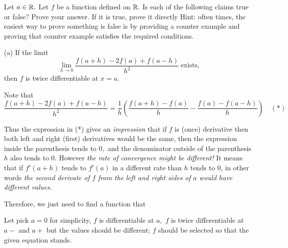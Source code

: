\documentclass{article}
\begin{document}
\newpage

\begin{problem*}[Problem 2a]
    Let $a \in \mathbb R.$ Let $f$ be a function defined on $\mathbb R.$
    Is each of the following claims true or false? Prove your answer.
    If it is true, prove it directly
    Hint: often times, the easiest way to prove something is false is by providing a counter example
    and proving that counter example satisfies the required conditions.

    (a) If the limit 
    \[
        \lim_{h \rightarrow 0} \frac{f(a+h) - 2f(a) + f(a-h)}{h^2}\ \text{exists,}
    \]
    then $f$ is twice differentiable at $x=a.$
\end{problem*}

\begin{remark*}
    Note that
    \[
        \frac{f(a+h) - 2f(a) + f(a-h)}{h^2} = \frac{1}{h} \left( \frac{f(a+h) - f(a)}{h} -  \frac{f(a) - f(a-h)}{h} \right) \quad (*)
    \]

    Thus the expression in (*) gives an \textit{impression} that if $f$ is (once) derivative then both left and right (first) derivatives would be the same,
    then the expression inside the parenthesis tends to $0,$ and the denominator outside of the parenthesis $h$ also tends to 0.
    However \textit{the rate of convergence might be different!}
    It means that if $f'(a+h)$ tends to $f'(a)$ in a different rate than $h$ tends to 0,
    in other words \textit{the second derivate of $f$ from the left and right sides of $a$ would have different values.}
    
    Therefore, we just need to find a function that
    \begin{itemize}[topsep=0pt, partopsep=0pt, itemsep=0pt]
        \ii Let pick $a=0$ for simplicity, $f$ is differentiable at $a,$ 
        \ii $f$ is twice differentiable at $a-$ and $a+$ but the values should be different;
        \ii $f$ should be selected so that the given equation stands.
    \end{itemize}
\end{remark*}
\end{document}
